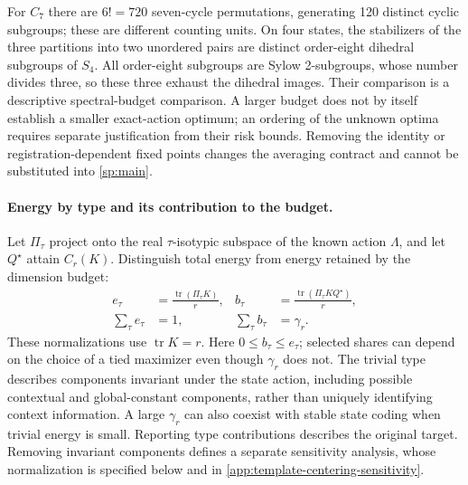 For $C_7$ there are $6!=720$ seven-cycle permutations, generating 120 distinct cyclic subgroups; these are different counting units. On four states, the stabilizers of the three partitions into two unordered pairs are distinct order-eight dihedral subgroups of $S_4$. All order-eight subgroups are Sylow 2-subgroups, whose number divides three, so these three exhaust the dihedral images. Their comparison is a descriptive spectral-budget comparison. A larger budget does not by itself establish a smaller exact-action optimum; an ordering of the unknown optima requires separate justification from their risk bounds. Removing the identity or registration-dependent fixed points changes the averaging contract and cannot be substituted into \cref{sp:main}.

\paragraph{Energy by type and its contribution to the budget.}
\label{sp:type-energy}
Let $\Pi_\tau$ project onto the real $\tau$-isotypic subspace of the known action $\Lambda$, and let $Q^\star$ attain $C_r(K)$. Distinguish total energy from energy retained by the dimension budget:
\[
 \begin{aligned}
 e_\tau
 &=
 \frac{\operatorname{tr}(\Pi_\tau K)}r,
 &
 b_\tau
 &=
 \frac{\operatorname{tr}(\Pi_\tau KQ^\star)}r,
 \\
 \sum_\tau e_\tau&=1,
 &
 \sum_\tau b_\tau&=\gamma_r.
 \end{aligned}
\]
These normalizations use $\operatorname{tr}K=r$. Here $0\le b_\tau\le e_\tau$; selected shares can depend on the choice of a tied maximizer even though $\gamma_r$ does not. The trivial type describes components invariant under the state action, including possible contextual and global-constant components, rather than uniquely identifying context information. A large $\gamma_r$ can also coexist with stable state coding when trivial energy is small. Reporting type contributions describes the original target. Removing invariant components defines a separate sensitivity analysis, whose normalization is specified below and in \cref{app:template-centering-sensitivity}.

